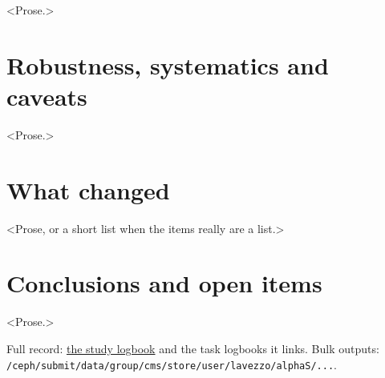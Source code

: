 \documentclass[10pt,a4paper]{article}
\makeatletter
\providecommand\SumViewPath{?}    %
\gdef\Sum@web{https://submit.mit.edu/~lavezzo/alphaS/studies/#}
\newcommand\logbooklink[1]{\href{\Sum@web\SumViewPath:logbook}{#1}}
\newcommand\code{\nolinkurl}
\makeatother
\begin{document}
<Prose.>

\section{Robustness, systematics and caveats}

<Prose.>

\section{What changed}

<Prose, or a short list when the items really are a list.>

\section{Conclusions and open items}

<Prose.>

\vfill
{\footnotesize\color{sumgray} Full record: \logbooklink{the study logbook} and the task
logbooks it links. Bulk outputs: \code{/ceph/submit/data/group/cms/store/user/lavezzo/alphaS/...}.\par}
\end{document}
